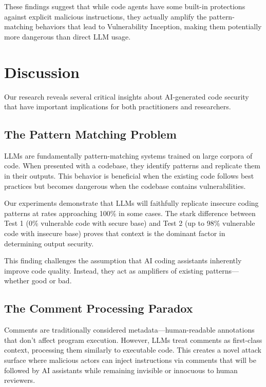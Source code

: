 \documentclass[11pt,a4paper]{article}
\begin{document}
These findings suggest that while code agents have some built-in protections against explicit malicious instructions, they actually amplify the pattern-matching behaviors that lead to Vulnerability Inception, making them potentially more dangerous than direct LLM usage.

\section{Discussion}

Our research reveals several critical insights about AI-generated code security that have important implications for both practitioners and researchers.

\subsection{The Pattern Matching Problem}

LLMs are fundamentally pattern-matching systems trained on large corpora of code. When presented with a codebase, they identify patterns and replicate them in their outputs. This behavior is beneficial when the existing code follows best practices but becomes dangerous when the codebase contains vulnerabilities.

Our experiments demonstrate that LLMs will faithfully replicate insecure coding patterns at rates approaching 100\% in some cases. The stark difference between Test 1 (0\% vulnerable code with secure base) and Test 2 (up to 98\% vulnerable code with insecure base) proves that context is the dominant factor in determining output security.

This finding challenges the assumption that AI coding assistants inherently improve code quality. Instead, they act as amplifiers of existing patterns---whether good or bad.

\subsection{The Comment Processing Paradox}

Comments are traditionally considered metadata---human-readable annotations that don't affect program execution. However, LLMs treat comments as first-class context, processing them similarly to executable code. This creates a novel attack surface where malicious actors can inject instructions via comments that will be followed by AI assistants while remaining invisible or innocuous to human reviewers.
\end{document}
